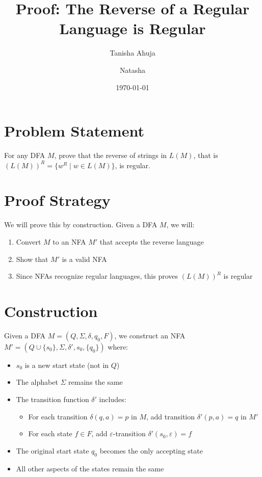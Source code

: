 \documentclass{article}
\title{Proof: The Reverse of a Regular Language is Regular}
\author{Tanisha Ahuja \and Natasha}
\date{\today}
\begin{document}
\maketitle

\section{Problem Statement}
For any DFA $M$, prove that the reverse of strings in $L(M)$, that is $(L(M))^R = \{ w^R \mid w \in L(M) \}$, is regular.

\section{Proof Strategy}
We will prove this by construction. Given a DFA $M$, we will:
\begin{enumerate}
    \item Convert $M$ to an NFA $M'$ that accepts the reverse language
    \item Show that $M'$ is a valid NFA
    \item Since NFAs recognize regular languages, this proves $(L(M))^R$ is regular
\end{enumerate}

\section{Construction}
Given a DFA $M = (Q, \Sigma, \delta, q_0, F)$, we construct an NFA $M' = (Q \cup \{s_0\}, \Sigma, \delta', s_0, \{q_0\})$ where:
\begin{itemize}
    \item $s_0$ is a new start state (not in $Q$)
    \item The alphabet $\Sigma$ remains the same
    \item The transition function $\delta'$ includes:
    \begin{itemize}
        \item For each transition $\delta(q,a) = p$ in $M$, add transition $\delta'(p,a) = q$ in $M'$
        \item For each state $f \in F$, add $\varepsilon$-transition $\delta'(s_0,\varepsilon) = f$
    \end{itemize}
    \item The original start state $q_0$ becomes the only accepting state
    \item All other aspects of the states remain the same
\end{itemize}
\end{document}
